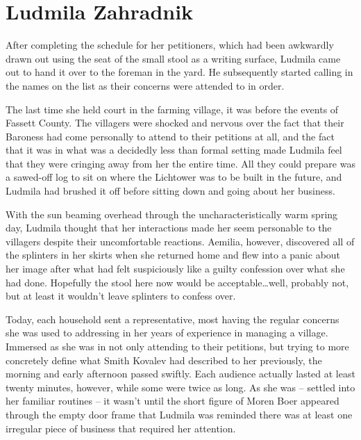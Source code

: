 \chapter{Ludmila Zahradnik}

After completing the schedule for her petitioners, which had been awkwardly drawn out using the seat of the small stool as a writing surface, Ludmila came out to hand it over to the foreman in the yard. He subsequently started calling in the names on the list as their concerns were attended to in order.

 

The last time she held court in the farming village, it was before the events of Fassett County. The villagers were shocked and nervous over the fact that their Baroness had come personally to attend to their petitions at all, and the fact that it was in what was a decidedly less than formal setting made Ludmila feel that they were cringing away from her the entire time. All they could prepare was a sawed-off log to sit on where the Lichtower was to be built in the future, and Ludmila had brushed it off before sitting down and going about her business.

 

With the sun beaming overhead through the uncharacteristically warm spring day, Ludmila thought that her interactions made her seem personable to the villagers despite their uncomfortable reactions. Aemilia, however, discovered all of the splinters in her skirts when she returned home and flew into a panic about her image after what had felt suspiciously like a guilty confession over what she had done. Hopefully the stool here now would be acceptable…well, probably not, but at least it wouldn’t leave splinters to confess over.

 

Today, each household sent a representative, most having the regular concerns she was used to addressing in her years of experience in managing a village. Immersed as she was in not only attending to their petitions, but trying to more concretely define what Smith Kovalev had described to her previously, the morning and early afternoon passed swiftly. Each audience actually lasted at least twenty minutes, however, while some were twice as long. As she was – settled into her familiar routines – it wasn’t until the short figure of Moren Boer appeared through the empty door frame that Ludmila was reminded there was at least one irregular piece of business that required her attention.

